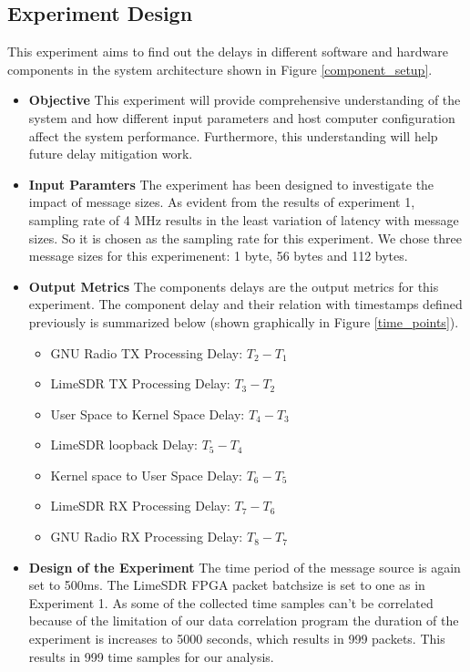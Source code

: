 \subsection{Experiment Design} \label{exp2}
This experiment aims to find out the delays in different software and hardware components in the system architecture shown in Figure \ref{component_setup}.
\begin{itemize}
    \item {\textbf{Objective} This experiment will provide comprehensive understanding of the system and how different input parameters and host computer configuration affect the system performance.
Furthermore, this understanding will help future delay mitigation work.}
\item{\textbf{Input Paramters} The experiment has been designed to investigate the impact of message sizes.
As evident from the results of experiment 1, sampling rate of 4 MHz results in the least variation of latency with message sizes.
So it is chosen as the sampling rate for this experiment.
We chose three message sizes for this experimenent: 1 byte, 56 bytes and 112 bytes.}
\item{\textbf{Output Metrics} The components delays are the output metrics for this experiment.
The component delay and their relation with timestamps defined previously is summarized below (shown graphically in Figure \ref{time_points}).
\begin{itemize}
    \item GNU Radio TX Processing Delay: $T_2 - T_1$ 
    \item LimeSDR TX Processing Delay: $T_3 - T_2$
    \item User Space to Kernel Space Delay: $T_4 - T_3$
    \item LimeSDR loopback Delay: $T_5 - T_4$
    \item Kernel space to User Space Delay: $T_6 - T_5$
    \item LimeSDR RX Processing Delay: $T_7 - T_6$
    \item GNU Radio RX Processing Delay: $T_8 - T_7$
\end{itemize}}
\item \textbf{Design of the Experiment} The time period of the message source is again set to 500ms. 
The LimeSDR FPGA packet batchsize is set to one as in Experiment 1.
As some of the collected time samples can't be correlated because of the limitation of our data correlation program the duration of the experiment is increases to 5000 seconds, which results in 999 packets.
This results in 999 time samples for our analysis.
\end{itemize}

